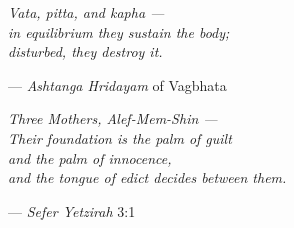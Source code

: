 \documentclass[openright]{book}
\begin{document}
\vspace{2mm}

\begin{center}\fontsize{10}{13}\selectfont\itshape
Vata, pitta, and kapha ---\\
in equilibrium they sustain the body;\\
disturbed, they destroy it.
\end{center}
\begin{flushright}
{\fontsize{8}{10}\selectfont --- \textit{Ashtanga Hridayam} of Vagbhata}
\end{flushright}

\vspace{2mm}

\begin{center}\fontsize{10}{13}\selectfont\itshape
Three Mothers, Alef-Mem-Shin ---\\
Their foundation is the palm of guilt\\
and the palm of innocence,\\
and the tongue of edict decides between them.
\end{center}
\begin{flushright}
{\fontsize{8}{10}\selectfont --- \textit{Sefer Yetzirah} 3:1}
\end{flushright}

\newpage
\end{document}
